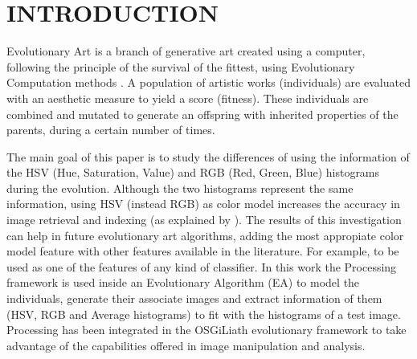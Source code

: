 \documentclass[a4paper,twoside]{article}
\begin{document}
\section{\uppercase{Introduction}}
\noindent Evolutionary Art \cite{EART} is a branch of generative art \cite{PHEROGRAPHY} created using a
computer, following the principle of the survival of the fittest, %
using Evolutionary Computation methods \cite{INTROEIBEN}. A population
of artistic works (individuals) are evaluated with an aesthetic
measure to yield a score (fitness). These individuals are combined and
mutated to generate an offspring with inherited properties of the
parents, during a certain number of times. 

The main goal of this paper is to study the differences of using
the information of the HSV (Hue, Saturation, Value) and RGB (Red,
Green, Blue) histograms during the evolution. Although the two histograms represent the same information, using HSV (instead RGB) as color model increases the accuracy in image retrieval and indexing (as explained by \cite{COLORDIFFERENCES}). The results of this investigation can help in future evolutionary art algorithms, adding the most appropiate color model feature with other features available in the literature. For example, to be used as one of the features of any kind of classifier.
In this work the Processing \cite{PROCESSING} framework is used inside an Evolutionary Algorithm (EA) to model the
individuals, generate their associate images and extract information
of them (HSV, RGB and Average histograms) to fit with the histograms
of a test image. Processing has been integrated in the OSGiLiath \cite{OSGILIATH} 
evolutionary framework to take advantage of the capabilities offered in image manipulation and analysis.


\end{document}
